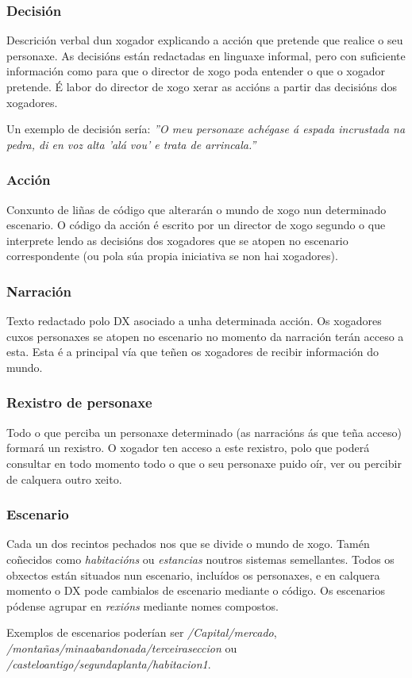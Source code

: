 \subsubsection{Decisión}
Descrición verbal dun xogador explicando a acción que pretende que realice o seu
personaxe. As decisións están redactadas en linguaxe informal, pero con
suficiente información como para que o director de xogo poda entender o que o
xogador pretende. É labor do director de xogo xerar as accións a partir das
decisións dos xogadores.
\par
Un exemplo de decisión sería: {\it ''O meu personaxe achégase á espada
incrustada na pedra, di en voz alta 'alá vou' e trata de arrincala.''}

\subsubsection{Acción}
Conxunto de liñas de código que alterarán o mundo de xogo nun determinado
escenario. O código da acción é escrito por un director de xogo segundo o que
interprete lendo as decisións dos xogadores que se atopen no escenario
correspondente (ou pola súa propia iniciativa se non hai xogadores).

\subsubsection{Narración}
Texto redactado polo DX asociado a unha determinada acción. Os xogadores cuxos
personaxes se atopen no escenario no momento da narración terán acceso a esta.
Esta é a principal vía que teñen os xogadores de recibir información do mundo.


\subsubsection{Rexistro de personaxe}
Todo o que perciba un personaxe determinado (as narracións ás que teña acceso)
formará un rexistro. O xogador ten acceso a este rexistro, polo que poderá
consultar en todo momento todo o que o seu personaxe puido oír, ver ou percibir
de calquera outro xeito.

\subsubsection{Escenario}
Cada un dos recintos pechados nos que se divide o mundo de xogo. Tamén coñecidos
como {\it habitacións} ou {\it estancias} noutros sistemas semellantes. Todos os
obxectos están situados nun escenario, incluídos os personaxes, e en calquera
momento o DX pode cambialos de escenario mediante o código. Os escenarios
pódense agrupar en {\it rexións} mediante nomes compostos.
\par
Exemplos de escenarios poderían ser {\it /Capital/mercado}, {\it
/montañas/minaabandonada/terceiraseccion} ou {\it
/casteloantigo/segundaplanta/habitacion1}.

